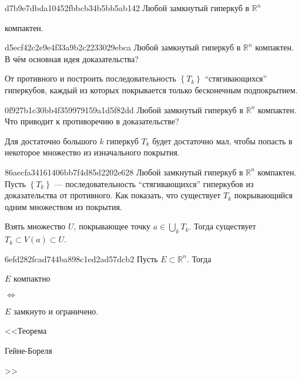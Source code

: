 \begin{note}{d7b9e7dbda10452fbbcb34b5bb5ab142}
    Любой замкнутый гиперкуб в \({ \mathbb R^{n} }\) \begin{icloze}{1}компактен.\end{icloze}
\end{note}

\begin{note}{d5ecf42c2e9e4f33a9b2c2233029ebca}
    Любой замкнутый гиперкуб в \({ \mathbb R^{n} }\) компактен.
    В чём основная идея доказательства?

    \begin{cloze}{1}
        От противного и построить последовательность \({ \left\{ T_k \right\} }\) ``стягивающихся'' гиперкубов, каждый из которых покрывается только бесконечным подпокрытием.
    \end{cloze}
\end{note}

\begin{note}{0f927b1c30bb4f359979159a1d5f82dd}
    Любой замкнутый гиперкуб в \({ \mathbb R^{n} }\) компактен.
    Что приводит к противоречию в доказательстве?

    \begin{cloze}{1}
        Для достаточно большого \({ k }\) гиперкуб \({ T_k }\) будет достаточно мал, чтобы попасть в некоторое множество из изначального покрытия.
    \end{cloze}
\end{note}

\begin{note}{86aecfa34161406bb7f4d85d2202e628}
    Любой замкнутый гиперкуб в \({ \mathbb R^{n} }\) компактен.
    Пусть \({ \left\{ T_k \right\} }\) --- последовательность ``стягивающихся'' гиперкубов из доказательства от противного.
    Как показать, что существует \({ T_k }\) покрывающийся одним множеством из покрытия.

    \begin{cloze}{1}
        Взять множество \({ U }\), покрывающее точку \({ a \in \bigcup_{k}^{} T_k }\). Тогда существует \({ T_k \subset V(a) \subset U }\).
    \end{cloze}
\end{note}

\begin{note}{6efd282fcad744ba898c1ed2ad57dcb2}
    Пусть \({ E \subset \mathbb R^{n} }\).
    Тогда
    \begin{center}
        \begin{icloze}{2}\({ E }\) компактно\end{icloze} \begin{icloze}{3}\({ \iff }\)\end{icloze} \begin{icloze}{1}\({ E }\) замкнуто и ограничено.\end{icloze}
    \end{center}

    \begin{center}
        \tiny <<Теорема \begin{icloze}{4}Гейне-Бореля\end{icloze}>>
    \end{center}
\end{note}

